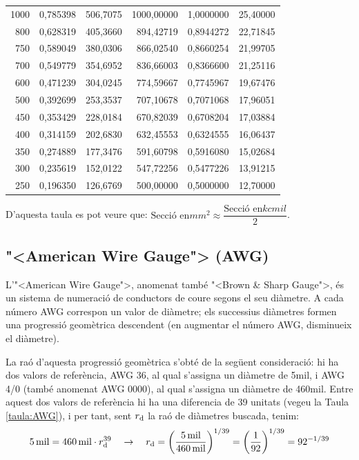 \begin{longtable}{r<{\hspace{0.6em}}rrrrr}
1000 &   0,785398 &   506,7075 & 1000,00000 &  1,0000000 &   25,40000 \\
 800 &   0,628319 &   405,3660 &  894,42719 &  0,8944272 &   22,71845 \\
 750 &   0,589049 &   380,0306 &  866,02540 &  0,8660254 &   21,99705 \\
 700 &   0,549779 &   354,6952 &  836,66003 &  0,8366600 &   21,25116 \\
 600 &   0,471239 &   304,0245 &  774,59667 &  0,7745967 &   19,67476 \\
 500 &   0,392699 &   253,3537 &  707,10678 &  0,7071068 &   17,96051 \\
 450 &   0,353429 &   228,0184 &  670,82039 &  0,6708204 &   17,03884 \\
 400 &   0,314159 &   202,6830 &  632,45553 &  0,6324555 &   16,06437 \\
 350 &   0,274889 &   177,3476 &  591,60798 &  0,5916080 &   15,02684 \\
 300 &   0,235619 &   152,0122 &  547,72256 &  0,5477226 &   13,91215 \\
 250 &   0,196350 &   126,6769 &  500,00000 &  0,5000000 &   12,70000 \\
\bottomrule[1pt]
\end{longtable}

D'aquesta taula es pot veure que: $\text{Secci\'{o} en}\unit{mm^2} \approx \dfrac{\text{Secci\'{o} en}\unit{kcmil}}{2}$.

\break
\subsection{{"<}American Wire Gauge{">} (AWG)}

L'{"<}American Wire Gauge{">}, anomenat tamb\'{e} {"<}Brown \& Sharp Gauge{">}, \'{e}s un sistema de numeraci\'{o} de conductors de coure segons el seu di\`{a}metre. A cada n\'{u}mero AWG correspon un valor de di\`{a}metre; els successius di\`{a}metres formen una progressi\'{o} geom\`{e}trica descendent (en augmentar el n\'{u}mero AWG, disminueix el di\`{a}metre).

La ra\'{o} d'aquesta progressi\'{o} geom\`{e}trica s'obt\'{e} de la seg\"{u}ent consideraci\'{o}: hi ha dos valors de refer\`{e}ncia, AWG 36, al qual s'assigna un di\`{a}metre de 5\unit{mil}, i AWG 4/0 (tamb\'{e} anomenat AWG 0000), al qual s'assigna un di\`{a}metre de 460\unit{mil}. Entre aquest dos valors de refer\`{e}ncia hi ha una diferencia de 39 unitats (vegeu la Taula \vref{taula:AWG}), i per tant, sent $r_\mathrm{d}$ la ra\'{o} de di\`{a}metres buscada, tenim:
\begin{equation}
   5\mathrm{\,mil} = 460\mathrm{\,mil} \cdot r_\mathrm{d}^{39} \quad \rightarrow \quad r_\mathrm{d} = \left( \frac{5\mathrm{\,mil}}{460\mathrm{\,mil}} \right)^{1/39} = \left( \frac{1}{92} \right)^{1/39} = 92^{-1/39}
\end{equation}

